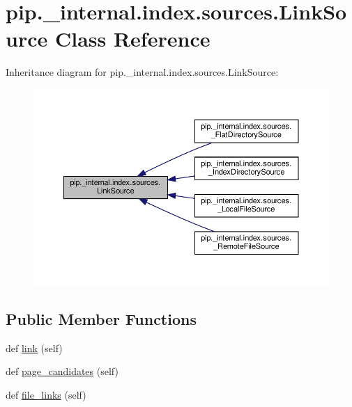 \hypertarget{classpip_1_1__internal_1_1index_1_1sources_1_1LinkSource}{}\section{pip.\+\_\+internal.\+index.\+sources.\+Link\+Source Class Reference}
\label{classpip_1_1__internal_1_1index_1_1sources_1_1LinkSource}


Inheritance diagram for pip.\+\_\+internal.\+index.\+sources.\+Link\+Source\+:
\nopagebreak
\begin{figure}[H]
\begin{center}
\leavevmode
\includegraphics[width=350pt]{classpip_1_1__internal_1_1index_1_1sources_1_1LinkSource__inherit__graph}
\end{center}
\end{figure}
\subsection*{Public Member Functions}
\begin{DoxyCompactItemize}
\item 
def \hyperlink{classpip_1_1__internal_1_1index_1_1sources_1_1LinkSource_a8fffc02e3e63a93c2857043a62054072}{link} (self)
\item 
def \hyperlink{classpip_1_1__internal_1_1index_1_1sources_1_1LinkSource_a82f7eb3c2be528b73c6af132eb846053}{page\+\_\+candidates} (self)
\item 
def \hyperlink{classpip_1_1__internal_1_1index_1_1sources_1_1LinkSource_a6114ac0ec5031c9d023c556254706c0a}{file\+\_\+links} (self)
\end{DoxyCompactItemize}


